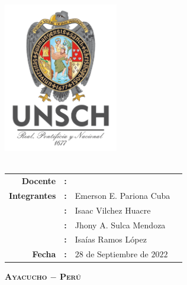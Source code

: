 \thispagestyle{empty}
\phantom{dy}
\begin{center}
	{\Large\scshape\bfseries \dyuniversity}\\
	\vspace{2.5mm}
	{\Large\scshape\bfseries \dyfaculty}\\
	\vspace{2.5mm}
	{\Large\scshape\bfseries \dydept}\\
	\vspace{8mm}
	\includegraphics[width=5cm]{Images/logo/logounsch_a.png}\\
	\vspace{2pt}
	{\Large\bfseries \dycourse}\\
	\vspace{2pt}
	\vspace{0.7cm}{\underline{\Large\bfseries\vphantom{dy}\dytitle}}
	\vspace{5pt}

	\boxabstractd{10cm}{\bfseries\large\centering \dytema}
	\vspace{1cm}
	\begin{center}
		\begin{tabular}{rcll}
			\bf Docente     & \bf: & \dyteacher{}                 & \\[5pt]
			\bf Integrantes & \bf: & Emerson E. Pariona Cuba      & \\[5pt]
			                & \bf: & Isaac Vilchez Huacre         & \\[5pt]
			                & \bf: & Jhony A. Sulca Mendoza       & \\[5pt]
			                & \bf: & Isaías Ramos López           & \\[5pt]
			\bf Fecha       & \bf: & $28$ de Septiembre de $2022$ & \\
		\end{tabular}
	\end{center}

	\vfill
	{\Large\scshape\bfseries Ayacucho $-$ Perú}\\
	\vspace{4mm} {\Large\bfseries\dycopyrightyear}
\end{center}

\cleardoublepage{}